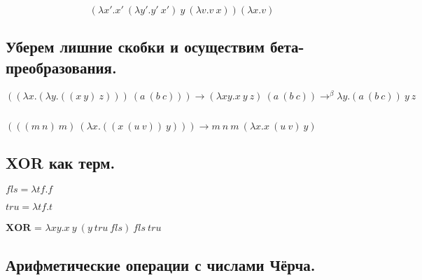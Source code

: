 \documentclass[a4paper,12pt]{article}
\theoremstyle{plain} %
\theoremstyle{definition} %
\theoremstyle{remark} %
\begin{document}
$$(\lambda x'. x' \ (\lambda y'. y' \ x') \ y \ (\lambda v. v \ x)) (\lambda x. v)$$

\subsection{Уберем лишние скобки и осуществим бета-преобразования.}
$((\lambda x. (\lambda y. ((x \ y) \ z))) \ (a \ (b \ c))) \longrightarrow (\lambda x y. x \ y \ z) \ (a \ (b \ c)) \rightarrow^{\beta} \lambda y. (a \ (b \ c)) \ y \ z$ 

$ $

$(((m \ n) \ m) \ ( \lambda x. ((x \ (u \ v)) \ y))) \longrightarrow m \ n \ m \ ( \lambda x. x \ (u \ v) \ y)$

\subsection{XOR как терм.}

$fls = \lambda t f. f$

$tru = \lambda t f. t$

$\boldsymbol{XOR}$ = $\lambda xy. x \ y \ (y \ tru \ fls) \ fls \ tru$

\subsection{Арифметические операции с числами Чёрча.}
\end{document}
